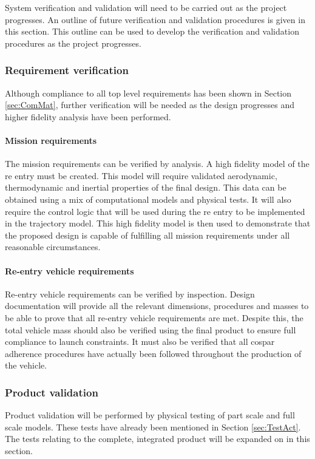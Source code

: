 System verification and validation will need to be carried out as the project progresses. An outline of future verification and validation procedures is given in this section. This outline can be used to develop the verification and validation procedures as the project progresses. 

\subsubsection{Requirement verification}
\label{sec:ReqVer}
Although compliance to all top level requirements has been shown in Section \ref{sec:ComMat}, further verification will be needed as the design progresses and higher fidelity analysis have been performed. 

\paragraph{Mission requirements}
The mission requirements can be verified by analysis. A high fidelity model of the re entry must be created. This model will require validated aerodynamic, thermodynamic and inertial properties of the final design. This data can be obtained using a mix of computational models and physical tests. It will also require the control logic that will be used during the re entry to be implemented in the trajectory model. This high fidelity model is then used to demonstrate that the proposed design is capable of fulfilling all mission requirements under all reasonable circumstances. 

\paragraph{Re-entry vehicle requirements}
Re-entry vehicle requirements can be verified by inspection. Design documentation will provide all the relevant dimensions, procedures and masses to be able to prove that all re-entry vehicle requirements are met. Despite this, the total vehicle mass should also be verified using the final product to ensure full compliance to launch constraints. It must also be verified that all \gls{cospar} adherence procedures have actually been followed throughout the production of the vehicle. 

\subsubsection{Product validation}
Product validation will be performed by physical testing of part scale and full scale models. These tests have already been mentioned in Section \ref{sec:TestAct}. The tests relating to the complete, integrated product will be expanded on in this section.  

